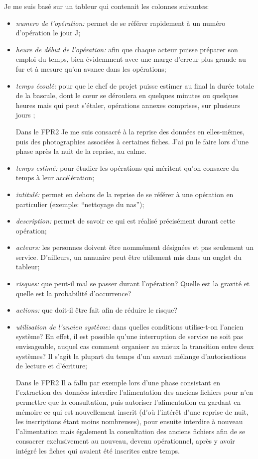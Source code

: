 \documentclass{book}
\begin{document}
Je me suis basé sur un tableur qui contenait les colonnes suivantes:
\begin{itemize}
 \item \textit{numero de l'opération:} permet de se référer rapidement à un numéro d'opération le jour J;
 \item \textit{heure de début de l'opération:} afin que chaque acteur puisse préparer son emploi du temps, bien évidemment avec une marge d'erreur plus grande au fur et à mesure qu'on avance dans les opérations;
 \item \textit{temps écoulé:} pour que le chef de projet puisse estimer au final la durée totale de la bascule, dont le cœur se déroulera en quelques minutes ou quelques heures mais qui peut s'étaler, opérations annexes comprises, sur plusieurs jours ;
 \begin{bclogo}[arrondi = 0.1, couleur = blue!10, logo = \bcinfo]{Dans le FPR2}
Je me suis consacré à la reprise des données en elles-mêmes, puis des photographies associées à certaines fiches. J'ai pu le faire lors d'une phase après la nuit de la reprise, au calme.
 \end{bclogo}
 \item \textit{temps estimé:} pour étudier les opérations qui méritent qu'on consacre du temps à leur accélération;
 \item \textit{intitulé:} permet en dehors de la reprise de se référer à une opération en particulier (exemple: ``nettoyage du \gls{nas}'');
 \item \textit{description:} permet de savoir ce qui est réalisé précisément durant cette opération;
 \item \textit{acteurs:} les personnes doivent être nommément désignées et pas seulement un service. D'ailleurs, un annuaire peut être utilement mis dans un onglet du tableur;
 \item \textit{risques:} que peut-il mal se passer durant l'opération? Quelle est la gravité et quelle est la probabilité d'occurrence?
 \item \textit{actions:} que doit-il être fait afin de réduire le risque?
 \item \textit{utilisation de l'ancien système:} dans quelles conditions utilise-t-on l'ancien système? En effet, il est possible qu'une interruption de service ne soit pas envisageable, auquel cas comment organiser au mieux la transition entre deux systèmes? Il s'agit la plupart du temps d'un savant mélange d'autorisations de lecture et d'écriture;
 \begin{bclogo}[arrondi = 0.1, couleur = blue!10, logo = \bcinfo]{Dans le FPR2}
Il a fallu par exemple lors d'une phase consistant en l'extraction des données interdire l'alimentation des anciens fichiers pour n'en permettre que la consultation, puis autoriser l'alimentation en gardant en mémoire ce qui est nouvellement inscrit (d'où l'intérêt d'une reprise de nuit, les inscriptions étant moins nombreuses), pour ensuite interdire à nouveau l'alimentation mais également la consultation des anciens fichiers afin de se consacrer exclusivement au nouveau, devenu opérationnel, après y avoir intégré les fiches qui avaient été inscrites entre temps.


\end{bclogo}
\end{itemize}
\end{document}
